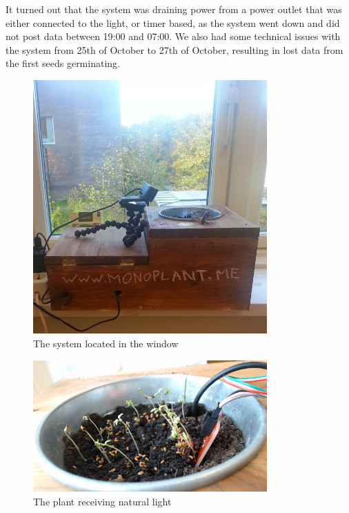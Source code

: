 It turned out that the system was draining power from a power outlet that was either connected to the light, or timer based, as the system went down and did not post data between 19:00 and 07:00. We also had some technical issues with the system from 25th of October to 27th of October, resulting in lost data from the first seeds germinating.

\begin{figure}
\centering
\includegraphics[width=0.8\textwidth]{img/empiricalsetting/window.jpg}
\caption{The system located in the window}
\label{fig:windowplant}
\end{figure}

\begin{figure}
\centering
\includegraphics[width=0.8\textwidth]{img/empiricalsetting/windowsystem.jpg}
\caption{The plant receiving natural light}
\label{fig:windowsystemplant}
\end{figure}



